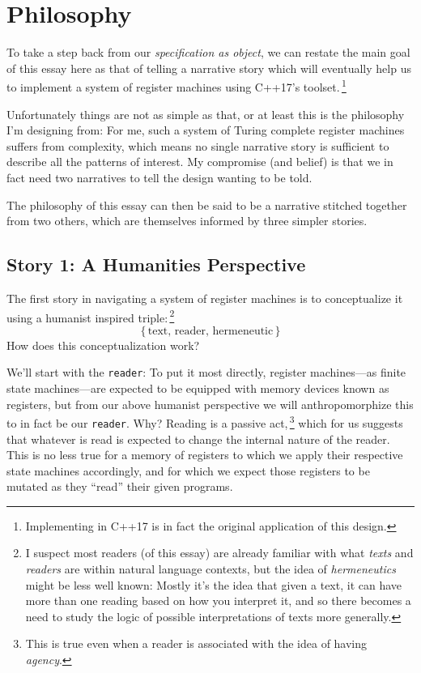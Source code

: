 \documentclass[twoside]{article}
\newcommand{\pdfnote}[1]{\,\footnote{#1}}
\begin{document}
\section*{Philosophy}

To take a step back from our \emph{specification as object}, we can restate the main goal of this essay here as that
of telling a narrative story which will eventually help us to implement a system of register machines using C++17's
toolset.\pdfnote{Implementing in C++17 is in fact the original application of this design.}

Unfortunately things are not as simple as that, or at least this is the philosophy I'm designing from: For me,
such a system of Turing complete register machines suffers from complexity, which means no single narrative story
is sufficient to describe all the patterns of interest. My compromise (and belief) is that we in fact need two
narratives to tell the design wanting to be told.

The philosophy of this essay can then be said to be a narrative stitched together from two others, which are themselves
informed by three simpler stories.

\subsection*{Story 1: A Humanities Perspective}

The first story in navigating a system of register machines is to conceptualize it using a humanist inspired
triple:\pdfnote{I suspect most readers (of this essay) are already familiar with what \emph{texts} and \emph{readers}
are within natural language contexts, but the idea of \emph{hermeneutics} might be less well known: Mostly it's the idea
that given a text, it can have more than one reading based on how you interpret it, and so there becomes a need to study
the logic of possible interpretations of texts more generally.}
$$ \{\,\mbox{text, reader, hermeneutic}\,\} $$
How does this conceptualization work?

We'll start with the \texttt{reader}: To put it most directly, register machines---as finite state machines---are expected
to be equipped with memory devices known as registers, but from our above humanist perspective we will anthropomorphize
this to in fact be our \texttt{reader}. Why? Reading is a passive act,\pdfnote{This is true even when a reader is associated
with the idea of having \emph{agency}.} which for us suggests that whatever is read is expected to change the internal
nature of the reader. This is no less true for a memory of registers to which we apply their respective state machines
accordingly, and for which we expect those registers to be mutated as they ``read'' their given programs.
\end{document}
